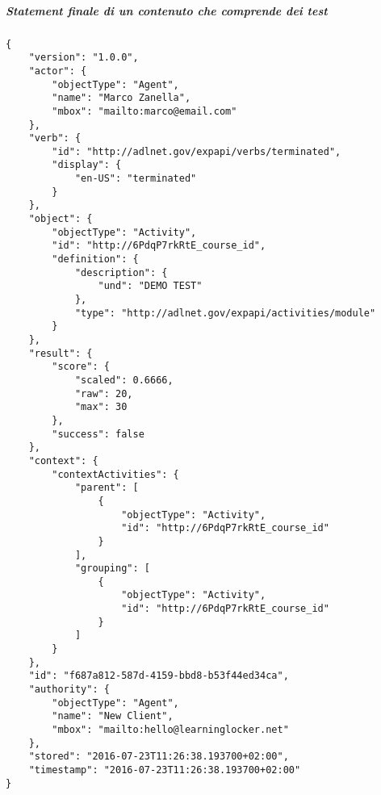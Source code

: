     \subparagraph*{Statement finale di un contenuto che comprende dei test}\hfill \break
    \begin{lstlisting}
{
    "version": "1.0.0",
    "actor": {
        "objectType": "Agent",
        "name": "Marco Zanella",
        "mbox": "mailto:marco@email.com"
    },
    "verb": {
        "id": "http://adlnet.gov/expapi/verbs/terminated",
        "display": {
            "en-US": "terminated"
        }
    },
    "object": {
        "objectType": "Activity",
        "id": "http://6PdqP7rkRtE_course_id",
        "definition": {
            "description": {
                "und": "DEMO TEST"
            },
            "type": "http://adlnet.gov/expapi/activities/module"
        }
    },
    "result": {
        "score": {
            "scaled": 0.6666,
            "raw": 20,
            "max": 30
        },
        "success": false
    },
    "context": {
        "contextActivities": {
            "parent": [
                {
                    "objectType": "Activity",
                    "id": "http://6PdqP7rkRtE_course_id"
                }
            ],
            "grouping": [
                {
                    "objectType": "Activity",
                    "id": "http://6PdqP7rkRtE_course_id"
                }
            ]
        }
    },
    "id": "f687a812-587d-4159-bbd8-b53f44ed34ca",
    "authority": {
        "objectType": "Agent",
        "name": "New Client",
        "mbox": "mailto:hello@learninglocker.net"
    },
    "stored": "2016-07-23T11:26:38.193700+02:00",
    "timestamp": "2016-07-23T11:26:38.193700+02:00"
}
    \end{lstlisting}